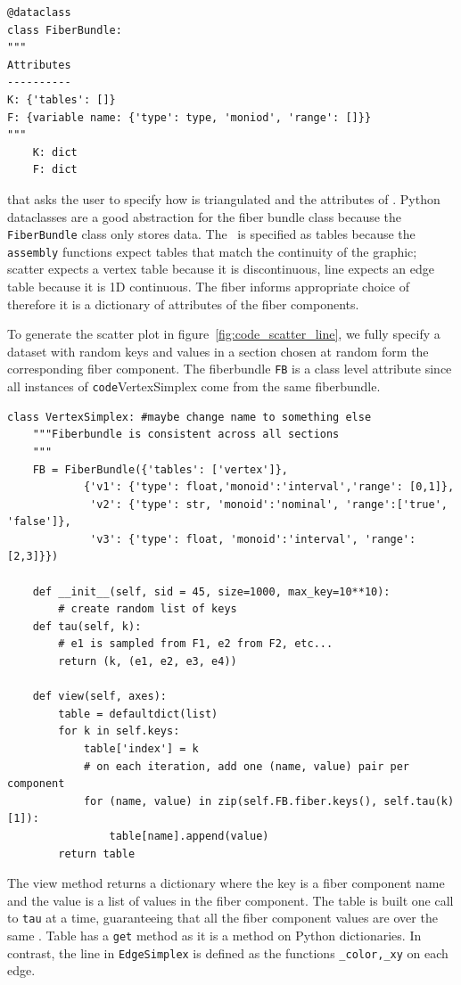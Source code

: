 \documentclass[../main.tex]{subfiles}
\begin{document}
\begin{verbatim}
@dataclass
class FiberBundle:
"""
Attributes
----------
K: {'tables': []}
F: {variable name: {'type': type, 'moniod', 'range': []}}
"""
    K: dict 
    F: dict
\end{verbatim}

that asks the user to specify how \dbase is triangulated and the attributes of \dfiber. Python dataclasses are a good abstraction for the fiber bundle class because the \texttt{FiberBundle} class only stores data. The \dbase\ is specified as tables because the \texttt{assembly} functions expect tables that match the continuity of the graphic; scatter expects a vertex table because it is discontinuous, line expects an edge table because it is 1D continuous. The fiber informs appropriate choice of \vchannel\, therefore it is a dictionary of attributes of the fiber components. 

To generate the scatter plot in figure~\ref{fig:code_scatter_line}, we fully specify a dataset with random keys and values in a section chosen at random form the corresponding fiber component. The fiberbundle \texttt{FB} is a class level attribute since all instances of \texttt{code}{VertexSimplex} come from the same fiberbundle.
\begin{verbatim}
class VertexSimplex: #maybe change name to something else
    """Fiberbundle is consistent across all sections
    """
    FB = FiberBundle({'tables': ['vertex']},  
            {'v1': {'type': float,'monoid':'interval','range': [0,1]},
             'v2': {'type': str, 'monoid':'nominal', 'range':['true', 'false']},
             'v3': {'type': float, 'monoid':'interval', 'range':[2,3]}})

    def __init__(self, sid = 45, size=1000, max_key=10**10):
        # create random list of keys
    def tau(self, k):
        # e1 is sampled from F1, e2 from F2, etc...
        return (k, (e1, e2, e3, e4))

    def view(self, axes):
        table = defaultdict(list)
        for k in self.keys:
            table['index'] = k
            # on each iteration, add one (name, value) pair per component
            for (name, value) in zip(self.FB.fiber.keys(), self.tau(k)[1]):
                table[name].append(value)
        return table
\end{verbatim}
The view method returns a dictionary where the key is a fiber component name and the value is a list of values in the fiber component. The table is built one call to \texttt{tau} at a time, guaranteeing that all the fiber component values are over the same \dbasepoint. Table has a \texttt{get} method as it is a method on Python dictionaries. In contrast, the line in \texttt{EdgeSimplex} is defined as the functions \texttt{_color,_xy} on each edge. 
\end{document}
